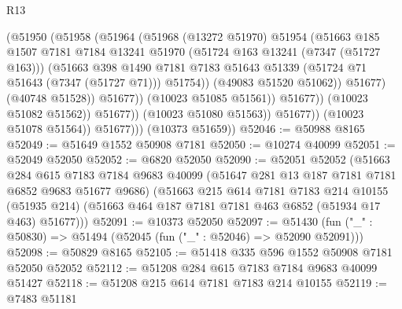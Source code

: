 \begin{lexlean}{R13}
\begin{coremodule}
                                  (@51950
                                    (@51958
                                      (@51964
                                        (@51968
                                          (@13272 @51970)
                                          @51954
                                          (@51663
                                            @185
                                            @1507
                                            @7181
                                            @7184
                                            @13241
                                            @51970
                                            (@51724 @163 @13241 (@7347 (@51727 @163)))
                                            (@51663
                                              @398
                                              @1490
                                              @7181
                                              @7183
                                              @51643
                                              @51339
                                              (@51724 @71 @51643 (@7347 (@51727 @71)))
                                              @51754))
                                          (@49083 @51520 @51062))
                                        @51677)
                                      (@40748 @51528))
                                    @51677))
                                (@10023 @51085 @51561))
                              @51677))
                          (@10023 @51082 @51562))
                        @51677))
                    (@10023 @51080 @51563))
                  @51677))
              (@10023 @51078 @51564))
            @51677)))
      (@10373 @51659))
@52046 := @50988 @8165
@52049 := @51649 @1552 @50908 @7181
@52050 := @10274 @40099
@52051 := @52049 @52050
@52052 := @6820 @52050
@52090 := @52051
    @52052
    (@51663
      @284
      @615
      @7183
      @7184
      @9683
      @40099
      (@51647 @281 @13 @187 @7181 @7181 @6852 @9683 @51677 @9686)
      (@51663
        @215
        @614
        @7181
        @7183
        @214
        @10155
        (@51935 @214)
        (@51663 @464 @187 @7181 @7181 @463 @6852 (@51934 @17 @463) @51677)))
@52091 := @10373 @52050
@52097 := @51430 (fun ("_" : @50830) => @51494 (@52045 (fun ("_" : @52046) => @52090 @52091)))
@52098 := @50829 @8165
@52105 := @51418 @335 @596 @1552 @50908 @7181 @52050 @52052
@52112 := @51208 @284 @615 @7183 @7184 @9683 @40099 @51427
@52118 := @51208 @215 @614 @7181 @7183 @214 @10155
@52119 := @7483 @51181

\end{coremodule}
\end{lexlean}
